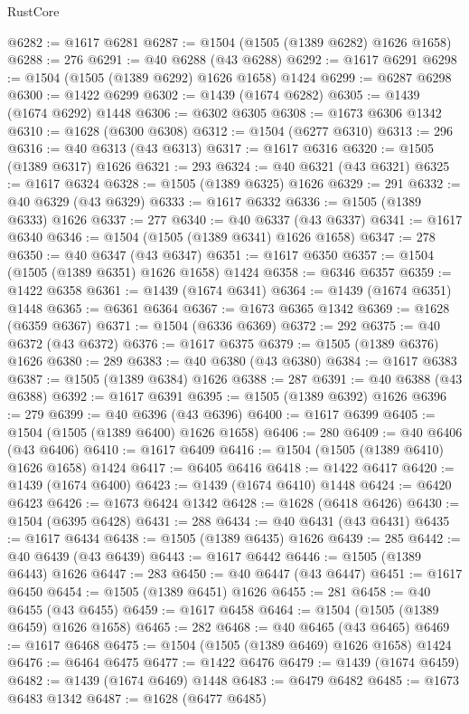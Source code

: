 \begin{lexlean}{RustCore}
\begin{coremodule}
@6282 := @1617 @6281
@6287 := @1504 (@1505 (@1389 @6282) @1626 @1658)
@6288 := 276
@6291 := @40 @6288 (@43 @6288)
@6292 := @1617 @6291
@6298 := @1504 (@1505 (@1389 @6292) @1626 @1658) @1424
@6299 := @6287 @6298
@6300 := @1422 @6299
@6302 := @1439 (@1674 @6282)
@6305 := @1439 (@1674 @6292) @1448
@6306 := @6302 @6305
@6308 := @1673 @6306 @1342
@6310 := @1628 (@6300 @6308)
@6312 := @1504 (@6277 @6310)
@6313 := 296
@6316 := @40 @6313 (@43 @6313)
@6317 := @1617 @6316
@6320 := @1505 (@1389 @6317) @1626
@6321 := 293
@6324 := @40 @6321 (@43 @6321)
@6325 := @1617 @6324
@6328 := @1505 (@1389 @6325) @1626
@6329 := 291
@6332 := @40 @6329 (@43 @6329)
@6333 := @1617 @6332
@6336 := @1505 (@1389 @6333) @1626
@6337 := 277
@6340 := @40 @6337 (@43 @6337)
@6341 := @1617 @6340
@6346 := @1504 (@1505 (@1389 @6341) @1626 @1658)
@6347 := 278
@6350 := @40 @6347 (@43 @6347)
@6351 := @1617 @6350
@6357 := @1504 (@1505 (@1389 @6351) @1626 @1658) @1424
@6358 := @6346 @6357
@6359 := @1422 @6358
@6361 := @1439 (@1674 @6341)
@6364 := @1439 (@1674 @6351) @1448
@6365 := @6361 @6364
@6367 := @1673 @6365 @1342
@6369 := @1628 (@6359 @6367)
@6371 := @1504 (@6336 @6369)
@6372 := 292
@6375 := @40 @6372 (@43 @6372)
@6376 := @1617 @6375
@6379 := @1505 (@1389 @6376) @1626
@6380 := 289
@6383 := @40 @6380 (@43 @6380)
@6384 := @1617 @6383
@6387 := @1505 (@1389 @6384) @1626
@6388 := 287
@6391 := @40 @6388 (@43 @6388)
@6392 := @1617 @6391
@6395 := @1505 (@1389 @6392) @1626
@6396 := 279
@6399 := @40 @6396 (@43 @6396)
@6400 := @1617 @6399
@6405 := @1504 (@1505 (@1389 @6400) @1626 @1658)
@6406 := 280
@6409 := @40 @6406 (@43 @6406)
@6410 := @1617 @6409
@6416 := @1504 (@1505 (@1389 @6410) @1626 @1658) @1424
@6417 := @6405 @6416
@6418 := @1422 @6417
@6420 := @1439 (@1674 @6400)
@6423 := @1439 (@1674 @6410) @1448
@6424 := @6420 @6423
@6426 := @1673 @6424 @1342
@6428 := @1628 (@6418 @6426)
@6430 := @1504 (@6395 @6428)
@6431 := 288
@6434 := @40 @6431 (@43 @6431)
@6435 := @1617 @6434
@6438 := @1505 (@1389 @6435) @1626
@6439 := 285
@6442 := @40 @6439 (@43 @6439)
@6443 := @1617 @6442
@6446 := @1505 (@1389 @6443) @1626
@6447 := 283
@6450 := @40 @6447 (@43 @6447)
@6451 := @1617 @6450
@6454 := @1505 (@1389 @6451) @1626
@6455 := 281
@6458 := @40 @6455 (@43 @6455)
@6459 := @1617 @6458
@6464 := @1504 (@1505 (@1389 @6459) @1626 @1658)
@6465 := 282
@6468 := @40 @6465 (@43 @6465)
@6469 := @1617 @6468
@6475 := @1504 (@1505 (@1389 @6469) @1626 @1658) @1424
@6476 := @6464 @6475
@6477 := @1422 @6476
@6479 := @1439 (@1674 @6459)
@6482 := @1439 (@1674 @6469) @1448
@6483 := @6479 @6482
@6485 := @1673 @6483 @1342
@6487 := @1628 (@6477 @6485)

\end{coremodule}
\end{lexlean}
